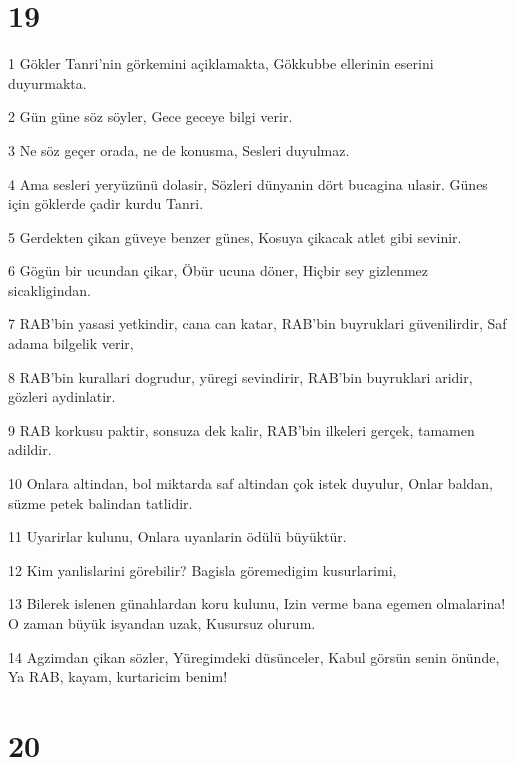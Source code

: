 \chapter{19}

\par 1 Gökler Tanri'nin görkemini açiklamakta, Gökkubbe ellerinin eserini duyurmakta.
\par 2 Gün güne söz söyler, Gece geceye bilgi verir.
\par 3 Ne söz geçer orada, ne de konusma, Sesleri duyulmaz.
\par 4 Ama sesleri yeryüzünü dolasir, Sözleri dünyanin dört bucagina ulasir. Günes için göklerde çadir kurdu Tanri.
\par 5 Gerdekten çikan güveye benzer günes, Kosuya çikacak atlet gibi sevinir.
\par 6 Gögün bir ucundan çikar, Öbür ucuna döner, Hiçbir sey gizlenmez sicakligindan.
\par 7 RAB'bin yasasi yetkindir, cana can katar, RAB'bin buyruklari güvenilirdir, Saf adama bilgelik verir,
\par 8 RAB'bin kurallari dogrudur, yüregi sevindirir, RAB'bin buyruklari aridir, gözleri aydinlatir.
\par 9 RAB korkusu paktir, sonsuza dek kalir, RAB'bin ilkeleri gerçek, tamamen adildir.
\par 10 Onlara altindan, bol miktarda saf altindan çok istek duyulur, Onlar baldan, süzme petek balindan tatlidir.
\par 11 Uyarirlar kulunu, Onlara uyanlarin ödülü büyüktür.
\par 12 Kim yanlislarini görebilir? Bagisla göremedigim kusurlarimi,
\par 13 Bilerek islenen günahlardan koru kulunu, Izin verme bana egemen olmalarina! O zaman büyük isyandan uzak, Kusursuz olurum.
\par 14 Agzimdan çikan sözler, Yüregimdeki düsünceler, Kabul görsün senin önünde, Ya RAB, kayam, kurtaricim benim!

\chapter{20}

